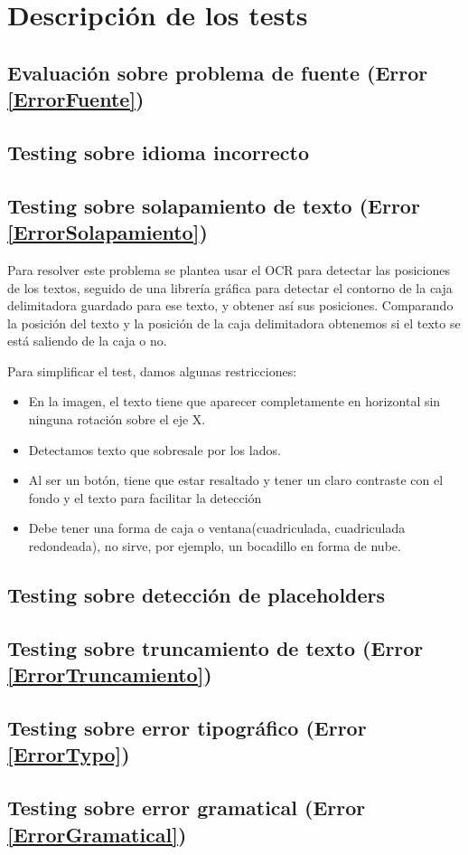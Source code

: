 \section{Descripción de los tests}




\subsection{Evaluación sobre problema de fuente (Error \ref{ErrorFuente})}


\subsection{Testing sobre idioma incorrecto}


\subsection{Testing sobre solapamiento de texto (Error \ref{ErrorSolapamiento})}
Para resolver este problema se plantea usar el OCR para detectar las posiciones de los textos, seguido de una librería gráfica para detectar el contorno de la caja delimitadora guardado para ese texto, y obtener así sus posiciones. Comparando la posición del texto y la posición de la caja delimitadora obtenemos si el texto se está saliendo de la caja o no.
	
Para simplificar el test, damos algunas restricciones: 
\begin{itemize}
	\item En la imagen, el texto tiene que aparecer completamente en horizontal sin ninguna rotación sobre el eje X.
	\item Detectamos texto que sobresale por los lados.
	\item Al ser un botón, tiene que estar resaltado y tener un claro contraste con el fondo y el texto para facilitar la detección
	\item Debe tener una forma de caja o ventana(cuadriculada, cuadriculada redondeada), no sirve, por ejemplo, un bocadillo en forma de nube.
\end{itemize} 
	
\subsection{Testing sobre detección de placeholders}


\subsection{Testing sobre truncamiento de texto (Error \ref{ErrorTruncamiento})}


\subsection{Testing sobre error tipográfico (Error \ref{ErrorTypo})}


\subsection{Testing sobre error gramatical (Error \ref{ErrorGramatical})}

 

